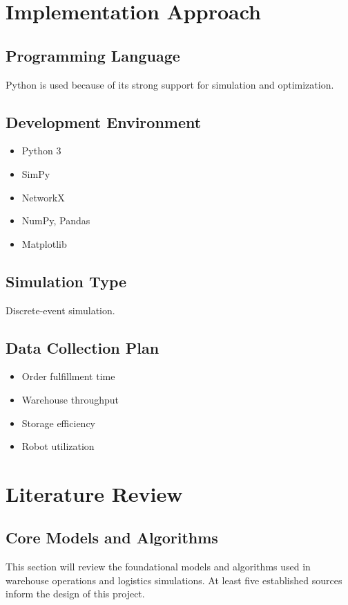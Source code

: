 \documentclass[onecolumn,12pt]{IEEEtran}
\begin{document}
\section{Implementation Approach}

\subsection{Programming Language}
Python is used because of its strong support for simulation and optimization.

\subsection{Development Environment}
\begin{itemize}
    \item Python 3
    \item SimPy
    \item NetworkX
    \item NumPy, Pandas
    \item Matplotlib
\end{itemize}

\subsection{Simulation Type}
Discrete-event simulation.

\subsection{Data Collection Plan}
\begin{itemize}
    \item Order fulfillment time
    \item Warehouse throughput
    \item Storage efficiency
    \item Robot utilization
\end{itemize}

\section{Literature Review}

\subsection{Core Models and Algorithms}

This section will review the foundational models and algorithms used in warehouse operations and logistics simulations. At least five established sources inform the design of this project.
\end{document}
